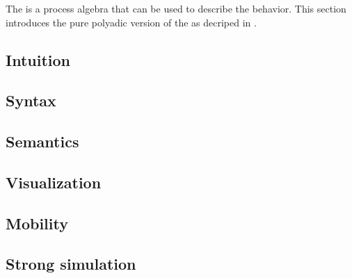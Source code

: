 The \findex[\picalc{}|(]{\picalc{}} is a process algebra that can be used to describe the behavior. This section introduces the pure polyadic version of the \picalc{} as decriped in \cite{milner}. 


\subsection{Intuition}
\label{sec_pi_intuition}


\subsection{Syntax}
\label{sec_pi_syntax}


\subsection{Semantics}
\label{sec_pi_sem}


\subsection{Visualization}
\label{sec_pi_visualization}


\subsection{Mobility}
\label{sec_pi_mobility}


\subsection{Strong simulation}
\label{sec_pi_simulation}


\newpage %
